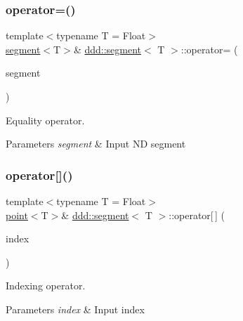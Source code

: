 \subsubsection{\texorpdfstring{operator=()}{operator=()}}
{\footnotesize\ttfamily template$<$typename T = Float$>$ \\
\hyperlink{classddd_1_1segment}{segment}$<$T$>$\& \hyperlink{classddd_1_1segment}{ddd\+::segment}$<$ T $>$\+::operator= (\begin{DoxyParamCaption}\item[{const \hyperlink{classddd_1_1segment}{segment}$<$ T $>$ \&}]{segment }\end{DoxyParamCaption})\hspace{0.3cm}{\ttfamily [inline]}}



Equality operator. 


\begin{DoxyParams}{Parameters}
{\em segment} & Input ND segment \\
\hline
\end{DoxyParams}
\mbox{\label{classddd_1_1segment_a38fb73f1bb682c0446eef1cce0cb5f21}} 
\subsubsection{\texorpdfstring{operator[]()}{operator[]()}\hspace{0.1cm}{\footnotesize\ttfamily [1/2]}}
{\footnotesize\ttfamily template$<$typename T = Float$>$ \\
\hyperlink{classddd_1_1point}{point}$<$T$>$\& \hyperlink{classddd_1_1segment}{ddd\+::segment}$<$ T $>$\+::operator\mbox{[}$\,$\mbox{]} (\begin{DoxyParamCaption}\item[{const std\+::size\+\_\+t \&}]{index }\end{DoxyParamCaption})\hspace{0.3cm}{\ttfamily [inline]}}



Indexing operator. 


\begin{DoxyParams}{Parameters}
{\em index} & Input index \\
\hline
\end{DoxyParams}
\mbox{\label{classddd_1_1segment_a7f491fcefb2c3d8f805b7a27ed93395f}} 
